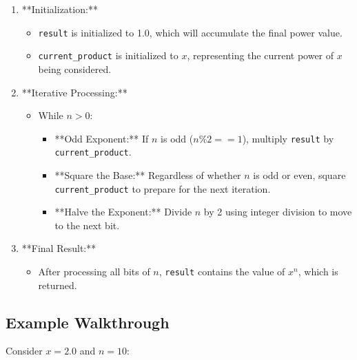 \begin{enumerate}
    \item **Initialization:**
    \begin{itemize}
        \item \texttt{result} is initialized to 1.0, which will accumulate the final power value.
        \item \texttt{current\_product} is initialized to \(x\), representing the current power of \(x\) being considered.
    \end{itemize}
    
    \item **Iterative Processing:**
    \begin{itemize}
        \item While \(n > 0\):
        \begin{itemize}
            \item **Odd Exponent:** If \(n\) is odd (\(n \% 2 == 1\)), multiply \texttt{result} by \texttt{current\_product}.
            \item **Square the Base:** Regardless of whether \(n\) is odd or even, square \texttt{current\_product} to prepare for the next iteration.
            \item **Halve the Exponent:** Divide \(n\) by 2 using integer division to move to the next bit.
        \end{itemize}
    \end{itemize}
    
    \item **Final Result:**
    \begin{itemize}
        \item After processing all bits of \(n\), \texttt{result} contains the value of \(x^n\), which is returned.
    \end{itemize}
\end{enumerate}

\subsection*{Example Walkthrough}

Consider \(x = 2.0\) and \(n = 10\):

